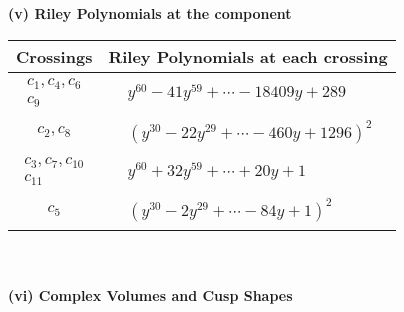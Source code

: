 \documentclass[1p]{elsarticle_modified}
\theoremstyle{definition}
\begin{document}
\newpage\renewcommand{\arraystretch}{1}
\flushleft \textbf{(v) Riley Polynomials at the component}\newline \\
\begin{tabular}{m{50pt}|m{274pt}}
Crossings & \hspace{64pt}Riley Polynomials at each crossing \\
\hline $$\begin{aligned}c_{1},c_{4},c_{6}\\c_{9}\end{aligned}$$&$\begin{aligned}
&y^{60}-41 y^{59}+\cdots-18409 y+289
\end{aligned}$\\
\hline $$\begin{aligned}c_{2},c_{8}\end{aligned}$$&$\begin{aligned}
&(y^{30}-22 y^{29}+\cdots-460 y+1296)^{2}
\end{aligned}$\\
\hline $$\begin{aligned}c_{3},c_{7},c_{10}\\c_{11}\end{aligned}$$&$\begin{aligned}
&y^{60}+32 y^{59}+\cdots+20 y+1
\end{aligned}$\\
\hline $$\begin{aligned}c_{5}\end{aligned}$$&$\begin{aligned}
&(y^{30}-2 y^{29}+\cdots-84 y+1)^{2}
\end{aligned}$\\
\hline
\end{tabular}\\~\\
\newpage\flushleft \textbf{(vi) Complex Volumes and Cusp Shapes}
\end{document}
